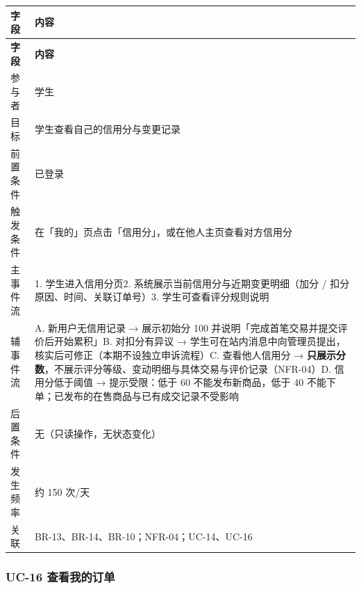 \documentclass[12pt,a4paper]{ctexart}
\begin{document}
{\footnotesize
\begin{longtable}{|p{2.75cm}|p{13.25cm}|}
\hline
\textbf{字段} & \textbf{内容} \\
\hline
\endfirsthead
\hline
\textbf{字段} & \textbf{内容} \\
\hline
\endhead
\hline
\endfoot
参与者 & 学生 \\
\hline
目标 & 学生查看自己的信用分与变更记录 \\
\hline
前置条件 & 已登录 \\
\hline
触发条件 & 在「我的」页点击「信用分」，或在他人主页查看对方信用分 \\
\hline
主事件流 & 1. 学生进入信用分页\newline{}2. 系统展示当前信用分与近期变更明细（加分 / 扣分原因、时间、关联订单号）\newline{}3. 学生可查看评分规则说明 \\
\hline
辅事件流 & A. 新用户无信用记录 → 展示初始分 100 并说明「完成首笔交易并提交评价后开始累积」\newline{}B. 对扣分有异议 → 学生可在站内消息中向管理员提出，核实后可修正（本期不设独立申诉流程）\newline{}C. 查看他人信用分 → \textbf{只展示分数}，不展示评分等级、变动明细与具体交易与评价记录（NFR-04）\newline{}D. 信用分低于阈值 → 提示受限：低于 60 不能发布新商品，低于 40 不能下单；已发布的在售商品与已有成交记录不受影响 \\
\hline
后置条件 & 无（只读操作，无状态变化） \\
\hline
发生频率 & 约 150 次/天 \\
\hline
关联 & BR-13、BR-14、BR-10；NFR-04；UC-14、UC-16 \\
\hline
\end{longtable}
}



\subsubsection*{UC-16 查看我的订单}
\end{document}
